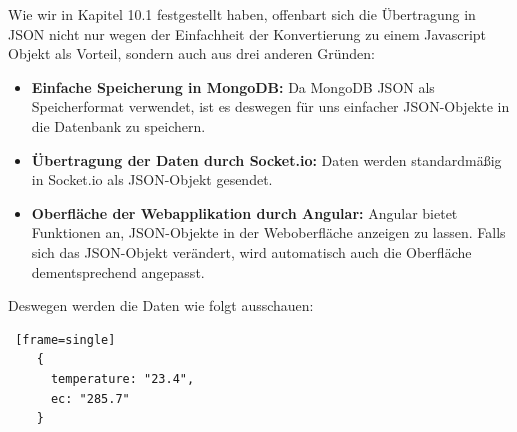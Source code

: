\documentclass[11pt]{article}
\begin{document}
Wie wir in Kapitel 10.1 festgestellt haben, offenbart sich die Übertragung in JSON nicht nur wegen der Einfachheit der Konvertierung zu einem Javascript Objekt als Vorteil, sondern auch aus drei anderen Gründen:
\begin{itemize}
    \item \textbf{Einfache Speicherung in MongoDB:} Da MongoDB JSON als Speicherformat verwendet, ist es deswegen für uns einfacher JSON-Objekte in die Datenbank zu speichern.
    \item \textbf{Übertragung der Daten durch Socket.io:} Daten werden standardmäßig in Socket.io als JSON-Objekt gesendet.
    \item \textbf{Oberfläche der Webapplikation durch Angular:} Angular bietet Funktionen an, JSON-Objekte in der Weboberfläche anzeigen zu lassen. Falls sich das JSON-Objekt verändert, wird automatisch auch die Oberfläche dementsprechend angepasst.
\end{itemize}

Deswegen werden die Daten wie folgt ausschauen:
\begin{lstlisting} [frame=single]
	{
	  temperature: "23.4",
	  ec: "285.7"
	}
\end{lstlisting}
\end{document}
